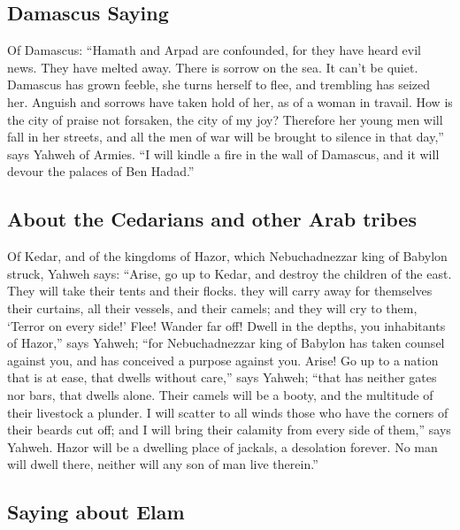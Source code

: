 \begin{paracol}{2}
\begin{otherlanguage}{english}
\hypertarget{damascus-saying}{%
\subsection{Damascus Saying}\label{damascus-saying}}

 Of Damascus: ``Hamath and Arpad are confounded, for they
have heard evil news. They have melted away. There is sorrow on the sea.
It can't be quiet.  Damascus has grown feeble, she turns
herself to flee, and trembling has seized her. Anguish and sorrows have
taken hold of her, as of a woman in travail.  How is the
city of praise not forsaken, the city of my joy? 
Therefore her young men will fall in her streets, and all the men of war
will be brought to silence in that day,'' says Yahweh of Armies.
 ``I will kindle a fire in the wall of Damascus, and it
will devour the palaces of Ben Hadad.''

\hypertarget{about-the-cedarians-and-other-arab-tribes}{%
\subsection{About the Cedarians and other Arab
tribes}\label{about-the-cedarians-and-other-arab-tribes}}

 Of Kedar, and of the kingdoms of Hazor, which
Nebuchadnezzar king of Babylon struck, Yahweh says: ``Arise, go up to
Kedar, and destroy the children of the east.  They will
take their tents and their flocks. they will carry away for themselves
their curtains, all their vessels, and their camels; and they will cry
to them, `Terror on every side!'  Flee! Wander far off!
Dwell in the depths, you inhabitants of Hazor,'' says Yahweh; ``for
Nebuchadnezzar king of Babylon has taken counsel against you, and has
conceived a purpose against you.  Arise! Go up to a
nation that is at ease, that dwells without care,'' says Yahweh; ``that
has neither gates nor bars, that dwells alone.  Their
camels will be a booty, and the multitude of their livestock a plunder.
I will scatter to all winds those who have the corners of their beards
cut off; and I will bring their calamity from every side of them,'' says
Yahweh.  Hazor will be a dwelling place of jackals, a
desolation forever. No man will dwell there, neither will any son of man
live therein.''

\hypertarget{saying-about-elam}{%
\subsection{Saying about Elam}\label{saying-about-elam}}


\end{otherlanguage}
\end{paracol}
